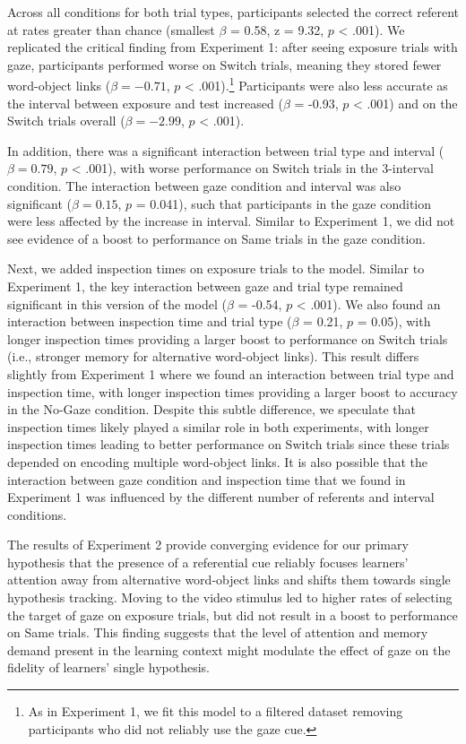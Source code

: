 \documentclass[authoryear, review]{elsarticle}
\begin{document}
Across all conditions for both trial types, participants selected the
correct referent at rates greater than chance (smallest \(\beta\) =
0.58, z = 9.32, \(p\) \textless{} .001). We replicated the critical
finding from Experiment 1: after seeing exposure trials with gaze,
participants performed worse on Switch trials, meaning they stored fewer
word-object links (\(\beta = -0.71\), \(p\) \textless{}
.001).\footnote{As in Experiment 1, we fit this model to a filtered dataset removing participants who did not reliably use the gaze cue.}
Participants were also less accurate as the interval between exposure
and test increased (\(\beta\) = -0.93, \(p\) \textless{} .001) and on
the Switch trials overall (\(\beta = -2.99\), \(p\) \textless{} .001).

In addition, there was a significant interaction between trial type and
interval (\(\beta = 0.79\), \(p\) \textless{} .001), with worse
performance on Switch trials in the 3-interval condition. The
interaction between gaze condition and interval was also significant
(\(\beta = 0.15\), \(p\) = 0.041), such that participants in the gaze
condition were less affected by the increase in interval. Similar to
Experiment 1, we did not see evidence of a boost to performance on Same
trials in the gaze condition.

Next, we added inspection times on exposure trials to the model. Similar
to Experiment 1, the key interaction between gaze and trial type
remained significant in this version of the model (\(\beta\) = -0.54,
\(p\) \textless{} .001). We also found an interaction between inspection
time and trial type (\(\beta\) = 0.21, \(p\) = 0.05), with longer
inspection times providing a larger boost to performance on Switch
trials (i.e., stronger memory for alternative word-object links). This
result differs slightly from Experiment 1 where we found an interaction
between trial type and inspection time, with longer inspection times
providing a larger boost to accuracy in the No-Gaze condition. Despite
this subtle difference, we speculate that inspection times likely played
a similar role in both experiments, with longer inspection times leading
to better performance on Switch trials since these trials depended on
encoding multiple word-object links. It is also possible that the
interaction between gaze condition and inspection time that we found in
Experiment 1 was influenced by the different number of referents and
interval conditions.

The results of Experiment 2 provide converging evidence for our primary
hypothesis that the presence of a referential cue reliably focuses
learners' attention away from alternative word-object links and shifts
them towards single hypothesis tracking. Moving to the video stimulus
led to higher rates of selecting the target of gaze on exposure trials,
but did not result in a boost to performance on Same trials. This
finding suggests that the level of attention and memory demand present
in the learning context might modulate the effect of gaze on the
fidelity of learners' single hypothesis.
\end{document}
